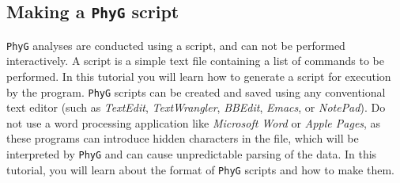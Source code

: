 \documentclass[11pt]{article}
\newcommand{\phyg}{\texttt{PhyG} }
\begin{document}
\subsection{Making a \phyg script}
\label{subsec:Scripts}

\phyg analyses are conducted using a script, and can not be performed interactively. 
A script is a simple text file containing a list of commands to be performed. In this 
tutorial you will learn how to generate a script for execution by the program. \phyg 
scripts can be created and saved using any conventional text editor (such as 
\textit{TextEdit}, \textit{TextWrangler}, \textit{BBEdit}, \textit{Emacs}, or \textit{NotePad}). 
Do not use a word processing application like \emph{Microsoft Word} or \emph{Apple 
Pages}, as these programs can introduce hidden characters in the file, which will be 
interpreted by \phyg and can cause unpredictable parsing of the data. In this tutorial, 
you will learn about the format of \phyg scripts and how to make them.
\end{document}
